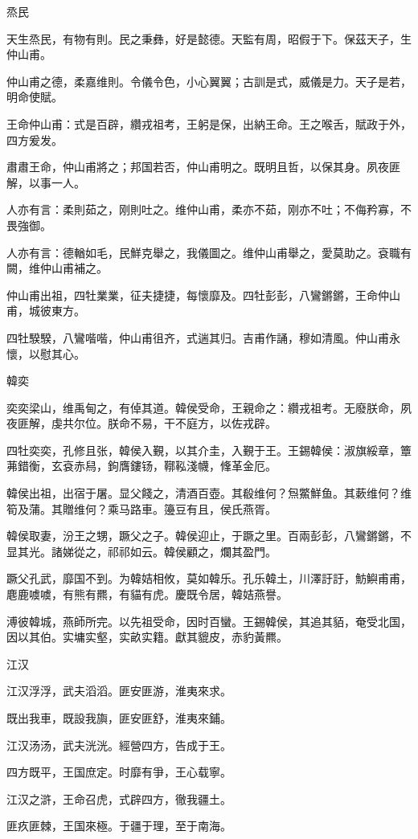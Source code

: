 烝民

天生烝民，有物有則。民之秉彝，好是懿德。天監有周，昭假于下。保茲天子，生仲山甫。

仲山甫之德，柔嘉维則。令儀令色，小心翼翼；古訓是式，威儀是力。天子是若，明命使賦。

王命仲山甫：式是百辟，纘戎祖考，王躬是保，出納王命。王之喉舌，賦政于外，四方爰发。

肅肅王命，仲山甫將之；邦国若否，仲山甫明之。既明且哲，以保其身。夙夜匪解，以事一人。

人亦有言：柔則茹之，刚則吐之。维仲山甫，柔亦不茹，刚亦不吐；不侮矜寡，不畏強御。

人亦有言：德輶如毛，民鮮克舉之，我儀圖之。维仲山甫舉之，愛莫助之。袞職有闕，维仲山甫補之。

仲山甫出祖，四牡業業，征夫捷捷，每懷靡及。四牡彭彭，八鸞鏘鏘，王命仲山甫，城彼東方。

四牡騤騤，八鸞喈喈，仲山甫徂齐，式遄其归。吉甫作誦，穆如清風。仲山甫永懷，以慰其心。

韓奕

奕奕梁山，维禹甸之，有倬其道。韓侯受命，王親命之：纘戎祖考。无廢朕命，夙夜匪解，虔共尔位。朕命不易，干不庭方，以佐戎辟。

四牡奕奕，孔修且张，韓侯入覲，以其介圭，入覲于王。王錫韓侯：淑旗綏章，簟茀錯衡，玄袞赤舄，鉤膺鏤钖，鞹鞃淺幭，鞗革金厄。

韓侯出祖，出宿于屠。显父餞之，清酒百壺。其殽维何？炰鱉鮮鱼。其蔌维何？维筍及蒲。其贈维何？乘马路車。籩豆有且，侯氏燕胥。

韓侯取妻，汾王之甥，蹶父之子。韓侯迎止，于蹶之里。百兩彭彭，八鸞鏘鏘，不显其光。諸娣從之，祁祁如云。韓侯顧之，爛其盈門。

蹶父孔武，靡国不到。为韓姞相攸，莫如韓乐。孔乐韓土，川澤訏訏，魴鱮甫甫，麀鹿噳噳，有熊有羆，有貓有虎。慶既令居，韓姞燕譽。

溥彼韓城，燕師所完。以先祖受命，因时百蠻。王錫韓侯，其追其貊，奄受北国，因以其伯。实墉实壑，实畝实籍。獻其貔皮，赤豹黃羆。

江汉

江汉浮浮，武夫滔滔。匪安匪游，淮夷來求。

既出我車，既設我旟，匪安匪舒，淮夷來鋪。

江汉汤汤，武夫洸洸。經營四方，告成于王。

四方既平，王国庶定。时靡有爭，王心载寧。

江汉之滸，王命召虎，式辟四方，徹我疆土。

匪疚匪棘，王国來極。于疆于理，至于南海。

